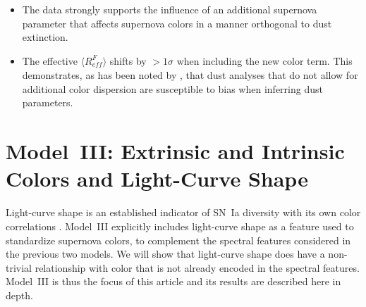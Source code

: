 \documentclass[trackchanges]{aastex61}   	%
\begin{document}
{\begin{itemize}
\item The data strongly supports the influence of an additional supernova parameter that affects supernova colors in a manner orthogonal to
 dust extinction.
\item The effective $\langle R^F_{\mathit{eff}}\rangle$ shifts by $>1 \sigma$ when including the new color term.  This demonstrates,
as has been noted by \citet{2011A&A...529L...4C}, that dust analyses
that do not allow for additional color dispersion are susceptible to bias when inferring dust parameters.
\end{itemize}

\section{Model~III: Extrinsic and Intrinsic Colors and Light-Curve Shape}
\label{modelIII:sec}

Light-curve shape is an established indicator of SN~Ia diversity 
\citep{1993ApJ...413L.105P, 1996ApJ...473...88R,
1997ApJ...483..565P}
with its own color correlations \citep{2005A&A...443..781G, 2007ApJ...659..122J}.
Model~III explicitly includes light-curve shape as a feature used to standardize supernova colors, to complement the
spectral features considered in the previous two models.
We will show that light-curve shape does have a non-trivial relationship with color that is not already encoded
in the spectral features.  Model~III is thus the focus of
this article and its results are  described here in depth.


}
\end{document}
